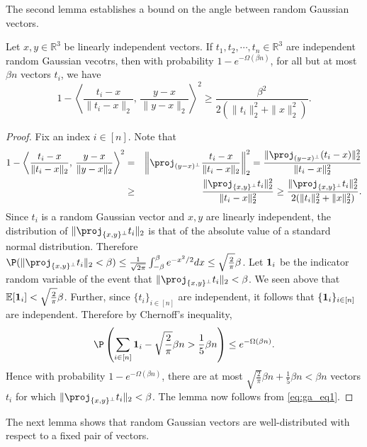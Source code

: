 The second lemma establishes a bound on the angle between random Gaussian vectors.

\begin{lemma} \label{lem:gaussian_angle}
Let $x,y\in\mathbb{R}^{3}$ be linearly independent vectors.
If $t_{1},t_{2},\cdots,t_{n}\in\mathbb{R}^{3}$ are independent random
Gaussian vecotrs, then with probability $1-e^{-\Omega(\beta n)}$,
for all but at most $\beta n$ vectors $t_{i}$, we have 
\[
1-\left\langle \frac{t_{i}-x}{\|t_{i}-x\|_2},\,\frac{y-x}{\|y-x\|_2}\right\rangle ^{2}\ge\frac{\beta^{2}}{2(\|t_{i}\|_2^{2}+\|x\|_2^{2})}.
\]
\end{lemma}
\begin{proof}
Fix an index $i\in[n]$. Note that 
\begin{eqnarray}
1-\left\langle \frac{t_{i}-x}{\|t_{i}-x\|_2},\,\frac{y-x}{\|y-x\|_2}\right\rangle ^{2} & = & \left\Vert \proj_{(y-x)^{\perp}}\frac{t_{i}-x}{\|t_{i}-x\|_2}\right\Vert_2^{2}=\frac{\|\proj_{(y-x)^{\perp}}(t_{i}-x)\|_2^{2}}{\|t_{i}-x\|_2^{2}} \nonumber\\
 & \ge & \frac{\|\proj_{\{x,y\}^{\perp}}t_{i}\|_2^{2}}{\|t_{i}-x\|_2^{2}}\ge\frac{\|\proj_{\{x,y\}^{\perp}}t_{i}\|_2^{2}}{2(\|t_{i}\|_2^{2}+\|x\|_2^{2})}. \label{eq:ga_eq1}
\end{eqnarray}
Since $t_{i}$ is a random Gaussian vector and $x,y$ are linearly independent, 
the distribution of $\|\proj_{\{x,y\}^{\perp}}t_{i}\|_2$
is that of the absolute value of a standard normal distribution. Therefore
$\P(\|\proj_{\{x,y\}^{\perp}}t_{i}\|_2<\beta)\le\frac{1}{\sqrt{2\pi}}\int_{-\beta}^{\beta}e^{-x^{2}/2}dx\le\sqrt{\frac{2}{\pi}}\beta$.
Let ${\bf 1}_i$ be the indicator random variable of the event that
$\|\proj_{\{x,y\}^{\perp}}t_{i}\|_2<\beta$. We seen above that $\mathbb{E}[{\bf 1}_i] < \sqrt{\frac{2}{\pi}}\beta$.
Further, since $\{t_{i}\}_{i \in [n]}$ are independent, it follows that $\{{\bf 1}_i\}_{i \in [n]}$ are independent.
Therefore by Chernoff's inequality,
\[
	\P\left( \sum_{i \in [n]} {\bf 1}_i - \sqrt{\frac{2}{\pi}}\beta n > \frac{1}{5} \beta n \right)
	\le e^{-\Omega(\beta n)}.
\]
Hence with probability $1-e^{-\Omega(\beta n)}$,
there are at most $\sqrt{\frac{2}{\pi}}\beta n + \frac{1}{5} \beta n < \beta n$ vectors $t_{i}$ for which $\|\proj_{\{x,y\}^{\perp}}t_{i}\|_2<\beta$. The lemma now follows from \eqref{eq:ga_eq1}.
\end{proof}

The next lemma shows that random Gaussian vectors are well-distributed
with respect to a fixed pair of vectors.

